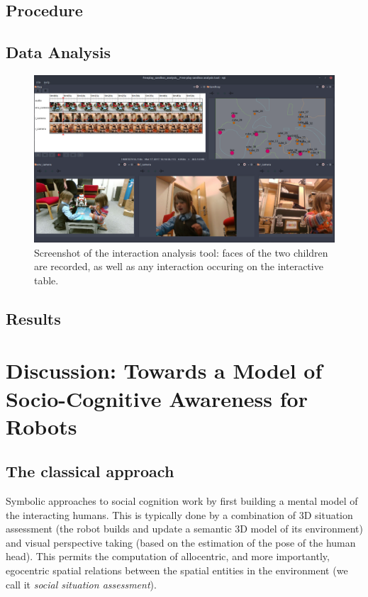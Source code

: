 \documentclass[a4paper]{article}
\begin{document}
\subsection{Procedure}

\subsection{Data Analysis}

\begin{figure}
    \centering
    \includegraphics[width=\linewidth]{analysis}
    \caption{Screenshot of the interaction analysis tool: faces of the two
    children are recorded, as well as any interaction occuring on the
    interactive table.}
    \label{fig|analysis}
\end{figure}

\subsection{Results}

\section{Discussion: Towards a Model of Socio-Cognitive Awareness for Robots}

\subsection{The classical approach}


Symbolic approaches to social cognition work by first building a mental model of the
interacting humans. This is typically done by a combination of 3D situation
assessment (the robot builds and update a semantic 3D model of its environment)
and visual perspective taking (based on the estimation of the pose of the human
head). This permits the computation of allocentric, and more importantly,
egocentric spatial relations between the spatial entities in the environment
(we call it \emph{social situation assessment}).
\end{document}
